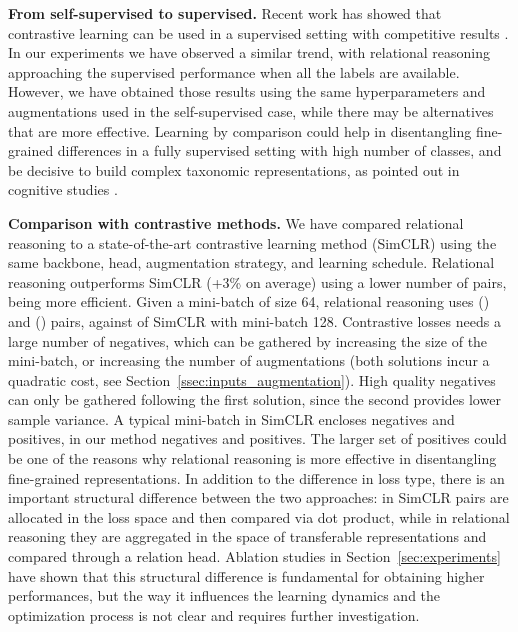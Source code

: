 \documentclass{article}
\begin{document}
\textbf{From self-supervised to supervised.} Recent work has showed that contrastive learning can be used in a supervised setting with competitive results \citep{prannay2020supervised}. In our experiments we have observed a similar trend, with relational reasoning approaching the supervised performance when all the labels are available. However, we have obtained those results using the same hyperparameters and augmentations used in the self-supervised case, while there may be alternatives that are more effective. Learning by comparison could help in disentangling fine-grained differences in a fully supervised setting with high number of classes, and be decisive to build complex taxonomic representations, as pointed out in cognitive studies \citep{gentner1999comparison, namy2002making}.

\textbf{Comparison with contrastive methods.} We have compared relational reasoning to a state-of-the-art contrastive learning method (SimCLR) using the same backbone, head, augmentation strategy, and learning schedule. Relational reasoning outperforms SimCLR (+3\% on average) using a lower number of pairs, being more efficient. Given a mini-batch of size 64, relational reasoning uses  () and  () pairs, against  of SimCLR with mini-batch 128.
Contrastive losses needs a large number of negatives, which can be gathered by increasing  the size of the mini-batch, or increasing  the number of augmentations (both solutions incur a quadratic cost, see Section~\ref{ssec:inputs_augmentation}). High quality negatives can only be gathered following the first solution, since the second provides lower sample variance. A typical mini-batch in SimCLR encloses  negatives and  positives, in our method  negatives and  positives. The larger set of positives could be one of the reasons why relational reasoning is more effective in disentangling fine-grained representations.
In addition to the difference in loss type, there is an important structural difference between the two approaches: in SimCLR pairs are allocated in the loss space and then compared via dot product, while in relational reasoning they are aggregated in the space of transferable representations and compared through a relation head. Ablation studies in Section~\ref{sec:experiments} have shown that this structural difference is fundamental for obtaining higher performances, but the way it influences the learning dynamics and the optimization process is not clear and requires further investigation.
\end{document}
